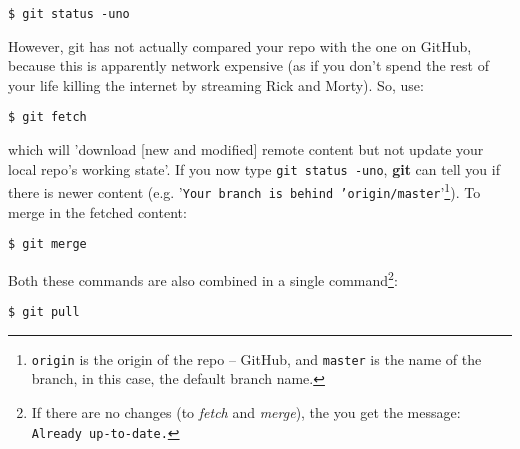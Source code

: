 \documentclass[11pt,fleqn]{book} %
\begin{document}
\vspace{-2mm}
\begin{verbatim}
$ git status -uno
\end{verbatim}
\vspace{-2mm}

\noindent However, git has not actually compared your repo with the one on GitHub, because this is apparently network expensive (as if you don't spend the rest of your life killing the internet by streaming Rick and Morty). So, use:

\vspace{-2mm}
\begin{verbatim}
$ git fetch
\end{verbatim}
\vspace{-2mm}

\noindent which will 'download [new and modified] remote content but not update your local repo's working state'. If you now type \texttt{git status -uno}, \textbf{git} can tell you if there is newer content (e.g. '\texttt{Your branch is behind 'origin/master}'\footnote{\texttt{origin} is the origin of the repo -- GitHub, and \texttt{master} is the name of the branch, in this case, the default branch name.}). To merge in the fetched content:

\vspace{-2mm}
\begin{verbatim}
$ git merge
\end{verbatim}
\vspace{-2mm}

Both these commands are also combined in a single command\footnote{If there are no changes (to \textit{fetch} and \textit{merge}), the you get the message: \texttt{Already up-to-date.}}:

\vspace{-2mm}
\begin{verbatim}
$ git pull
\end{verbatim}
\vspace{-2mm}
\end{document}
